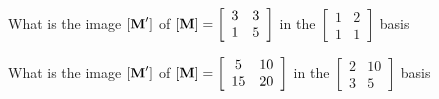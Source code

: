 \bexo
What is the image $[\textbf{M}']$ of 
$[\textbf{M}]=\left[
\begin{array}{cc}
3 & 3 \\
1 & 5
\end{array}
\right]
$
 in the 
$\left[
\begin{array}{cc}
1 & 2 \\
1& 1
\end{array}
\right]
$ basis

\eexo\solution{
\begin{equation*}
[\tb{M}']=\left[
\begin{array}{cc}
6 & 5 \\
0 & 2
\end{array}
\right]
\end{equation*}
}


\bexo
What is the image $[\textbf{M}']$ of 
$[\textbf{M}]=\left[
\begin{array}{cc}
5 & 10 \\
15 & 20
\end{array}
\right]
$
 in the 
$\left[
\begin{array}{cc}
2 & 10 \\
3 & 5
\end{array}
\right]
$ basis

\eexo\solution{
\begin{equation*}
[\tb{M}']=\left[
\begin{array}{cc}
35 & 100 \\
-3 & -10
\end{array}
\right]
\end{equation*}
}

